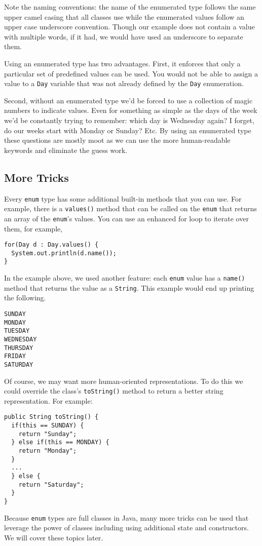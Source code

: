 Note the naming conventions: the name of the enumerated type
follows the same upper camel casing that all classes use while 
the enumerated values follow an upper case underscore convention.  
Though our example does not contain a value with multiple words, 
if it had, we would have used an underscore to separate them.  

Using an enumerated type has two advantages.  First, it enforces
that only a particular set of predefined values can be used.  You
would not be able to assign a value to a \texttt{Day} 
variable that was not already defined by the \texttt{Day}
enumeration.

Second, without an enumerated type we'd be forced
to use a collection of \glspl{magic number} to indicate values.  
Even for something as simple as the days of the week we'd be
constantly trying to remember: which day is Wednesday again?
I forget, do our weeks start with Monday or Sunday?  Etc.  By
using an enumerated type these questions are mostly moot as
we can use the more human-readable keywords and eliminate
the guess work.

\subsection{More Tricks}

Every \texttt{enum} type has some additional built-in
methods that you can use.  For example, there is a \texttt{values()}
method that can be called on the \texttt{enum} that
returns an array of the \texttt{enum}'s values.  You
can use an enhanced for loop to iterate over them, for example, 

\begin{verbatim}
for(Day d : Day.values() {
  System.out.println(d.name());
}
\end{verbatim}

In the example above, we used another feature: each 
\texttt{enum} value has a \texttt{name()} 
method that returns the value as a \texttt{String}.
This example would end up printing the following.

\begin{verbatim}
SUNDAY
MONDAY
TUESDAY
WEDNESDAY
THURSDAY
FRIDAY
SATURDAY
\end{verbatim}

Of course, we may want more human-oriented representations.  
To do this we could override the class's \texttt{toString()}
method to return a better string representation.  For example:

\begin{verbatim}
public String toString() {
  if(this == SUNDAY) {
    return "Sunday";
  } else if(this == MONDAY) {
    return "Monday";
  }
  ...
  } else {
    return "Saturday";
  }
}
\end{verbatim}

Because \texttt{enum} types are full classes in Java, 
many more tricks can be used that leverage the power of classes
including using additional state and constructors.  We will cover
these topics later.







